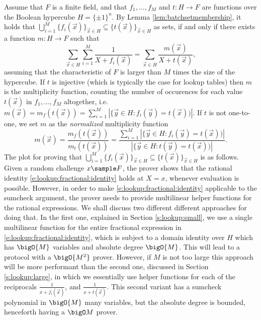 \documentclass[11pt]{article}
\theoremstyle{definition}
\theoremstyle{remark}
\begin{document}
Assume that $F$ is a finite field, and that $f_1, \ldots, f_M$ and  $t: H\rightarrow F$ are functions over the Boolean hypercube $H=\{\pm 1\}^n$. 
By Lemma \ref{lem:batchsetmembership}, it holds that $\bigcup_{i=1}^M \{f_i(\vec x)\}_{\vec x\in H}\subseteq \{t(\vec x)\}_{\vec x\in H}$ as sets, if and only if there exists a function $m: H\rightarrow F$ such that
\begin{equation}
\label{e:lookup:fractional:identity}
\sum_{\vec x\in H} \sum_{i=1}^M \frac{1}{X + f_i(\vec x)} = \sum_{\vec x\in H} \frac{m(\vec x)}{X + t(\vec x)},
\end{equation}
assuming that the characteristic of $F$ is larger than $M$ times the size of the hypercube.
If $t$ is injective (which is typically the case for lookup tables) then $m$ is the multiplicity function, counting the number of occurences for each value $t(\vec x)$ in $f_1,\ldots, f_M$ altogether, i.e.
$m(\vec x) = m_f(t(\vec x)) = \sum_{i=1}^M|\{\vec y \in H: f_i(\vec y) = t(\vec x))|$.
If $t$ is not one-to-one, we set $m$ as the \textit{normalized} multiplicity function 
\begin{equation}
\label{e:lookup:m}
m(\vec x) = 
\frac{m_f(t(\vec x))}{m_t(t(\vec x))} = \frac{ \sum_{i=1}^M |\{\vec y \in H: f_i(\vec y) = t(\vec x))|}{ |\{\vec y \in H: t(\vec y) = t(\vec x))|}.
\end{equation}
The plot for proving that $\bigcup_{i=1}^M \{f_i(\vec x)\}_{\vec x\in H}\subseteq \{t(\vec x)\}_{\vec x\in H}$ is as follows.
Given a random challenge $x\sample F$, the prover shows that the rational identity \eqref{e:lookup:fractional:identity} holds at $X= x$, whenever evaluation is possible. 
However, in order to make \eqref{e:lookup:fractional:identity} applicable to the sumcheck argument, the prover needs to provide multilinear helper functions for the rational expressions. 
We shall discuss two different different approaches for doing that.
In  the first one, explained in Section \ref{s:lookup:small}, we use a single multilinear function for the entire fractional expression in \eqref{e:lookup:fractional:identity}, which is subject to a domain identity over $H$ which has $\bigO{M}$ variables and absolute degree $\bigO{M}$.
This will lead to a protocol with a $\bigO{M^2}$ prover. 
However, if $M$ is not too large this approach will be more performant than the second one, discussed in Section \ref{s:lookup:large}, in which we essentially use helper functions for each of the reciprocals $\frac{1}{x + f_i(\vec x)}$, and $\frac{1}{x + t(\vec x)}$. 
This second variant has a sumcheck polynomial in $\bigO{M}$ many variables, but the absolute degree is bounded, henceforth having a $\bigO M$ prover.
\end{document}
